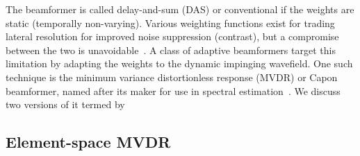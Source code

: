 {The beamformer is called delay-and-sum (DAS) or conventional if the weights are static (temporally non-varying). Various weighting functions exist for trading lateral resolution for improved noise suppression (contrast), but a compromise between the two is unavoidable~\cite{Harris1978}. A class of adaptive beamformers target this limitation by adapting the weights to the dynamic impinging wavefield. One such technique is the minimum variance distortionless response (MVDR) or Capon beamformer, named after its maker for use in spectral estimation~\cite{Capon1969}. We discuss two versions of it termed by 








\subsection{Element-space MVDR}

%

}
